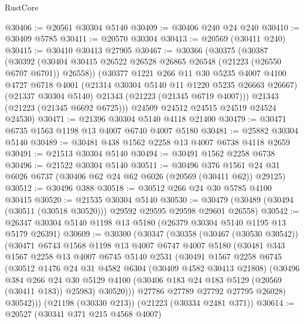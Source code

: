\begin{lexlean}{RustCore}
\begin{coremodule}
@30406 := @20561 @30304 @5140
@30409 := @30406 @240 @24 @240
@30410 := @30409 @5785
@30411 := @20570 @30304
@30413 := @20569 (@30411 @240)
@30415 := @30410 @30413 @27905
@30467 := @30366
    (@30375
      (@30387
        (@30392 (@30404 @30415 @26522 @26528 @26865 @26548 (@21223 (@26550 @6707 @6701)) @26558))
        (@30377
          @1221
          @266
          @11
          @30
          @5235
          @4007
          @4100
          @4727
          @6718
          @4001
          (@21314 @30304 @5140 @11 @1220 @5235 @26663 @26667)
          (@21337 @30304 @5140)
          @21343
          (@21223 (@21345 @6719 @4007)))
        @21343
        (@21223 (@21345 @6692 @6725)))
      @24509
      @24512
      @24515
      @24519
      @24524
      @24530)
@30471 := @21396 @30304 @5140 @4118 @21400
@30479 := @30471 @6735 @1563 @1198 @13 @4007 @6740 @4007 @5180
@30481 := @25882 @30304 @5140
@30489 := @30481 @438 @1562 @2258 @13 @4007 @6738 @4118 @2659
@30491 := @21513 @30304 @5140
@30494 := @30491 @1562 @2258 @6738
@30496 := @21522 @30304 @5140
@30511 := @30496
    @376
    @1561
    @24
    @31
    @6026
    @6737
    (@30406 @62 @24 @62 @6026 (@20569 (@30411 @62)) @29125)
@30512 := @30496 @388
@30518 := @30512 @266 @24 @30 @5785 @4100 @30415
@30520 := @21535 @30304 @5140
@30530 := @30479 (@30489 (@30494 (@30511 (@30518 @30520))) @29592 @29595 @29598 @29601 @26558)
@30542 := @26347 @30304 @5140 @1198 @13 @5180 (@26379 @30304 @5140 @1195 @13 @5179 @26391)
@30609 := @30300
    (@30347
      (@30358
        (@30467 (@30530 @30542))
        (@30471
          @6743
          @1568
          @1198
          @13
          @4007
          @6747
          @4007
          @5180
          (@30481
            @343
            @1567
            @2258
            @13
            @4007
            @6745
            @5140
            @2531
            (@30491
              @1567
              @2258
              @6745
              (@30512
                @1476
                @24
                @31
                @4582
                @6304
                (@30409 @4582 @30413 @21808)
                (@30496
                  @384
                  @266
                  @24
                  @30
                  @5129
                  @4100
                  (@30406 @183 @24 @183 @5129 (@20569 (@30411 @183)) @25983)
                  @30520)))
            @27786
            @27789
            @27792
            @27795
            @26028)
          @30542)))
    (@21198 (@30330 @213))
    (@21223 (@30334 @2481 @371))
@30614 := @20527 (@30341 @371 @215 @4568 @4007)

\end{coremodule}
\end{lexlean}
